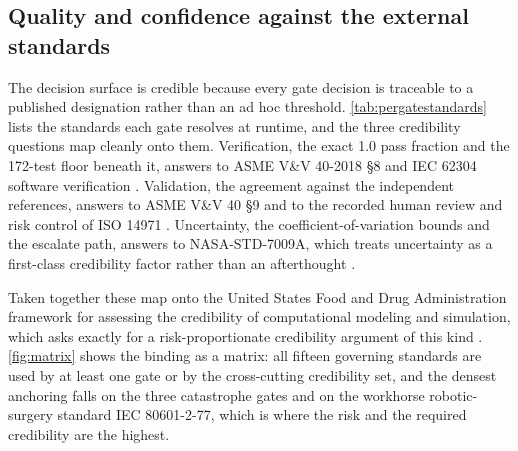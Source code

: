 \subsection{Quality and confidence against the external standards}

The decision surface is credible because every gate decision is traceable to a
published designation rather than an ad hoc threshold.
\autoref{tab:pergatestandards} lists the standards each gate resolves at runtime,
and the three credibility questions map cleanly onto them. Verification, the
exact 1.0 pass fraction and the 172-test floor beneath it, answers to ASME V\&V
40-2018 \S8 and IEC 62304 software verification \cite{asmevv40, iec62304}.
Validation, the agreement against the independent references, answers to ASME
V\&V 40 \S9 and to the recorded human review and risk control of ISO 14971
\cite{iso14971}. Uncertainty, the coefficient-of-variation bounds and the
escalate path, answers to NASA-STD-7009A, which treats uncertainty as a
first-class credibility factor rather than an afterthought \cite{nasastd7009a}.

Taken together these map onto the United States Food and Drug Administration
framework for assessing the credibility of computational modeling and simulation,
which asks exactly for a risk-proportionate credibility argument of this kind
\cite{fda2023credibility}. \autoref{fig:matrix} shows the binding as a matrix:
all fifteen governing standards are used by at least one gate or by the
cross-cutting credibility set, and the densest anchoring falls on the three
catastrophe gates and on the workhorse robotic-surgery standard IEC 80601-2-77,
which is where the risk and the required credibility are the highest.

\clearpage

